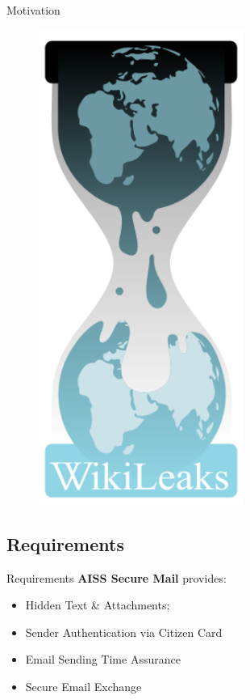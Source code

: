 \begin{frame}{Motivation}
\begin{minipage}[t]{0.7\linewidth}
\end{minipage}%
\hfill
\begin{minipage}[t]{0.3\linewidth}
 \centering
 \vspace{-1.5ex}
\begin{figure}[H]
\centering
\includegraphics[width=0.6\textwidth]{./images/wikileaks.png}
\end{figure}
\end{minipage}
   



\end{frame}


\subsection{Requirements}
\begin{frame}{Requirements}
\textbf{AISS Secure Mail}  provides: 
\begin{itemize}
\item Hidden Text \& Attachments;
\item Sender Authentication via Citizen Card
\item Email Sending Time Assurance
\item Secure Email Exchange
\end{itemize}
\end{frame}

